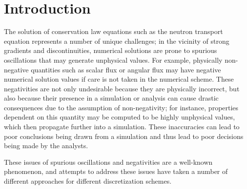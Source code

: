 \section{Introduction}
The solution of conservation law equations such as the neutron transport
equation represents a number of unique challenges; in the vicinity of strong
gradients and discontinuities, numerical solutions are prone to spurious
oscillations that may generate unphysical values. For example, physically
non-negative quantities such as scalar flux or angular flux may have negative
numerical solution values if care is not taken in the numerical scheme.
These negativities are not only undesirable because they are physically
incorrect, but also because their presence in a simulation or analysis
can cause drastic consequences due to the assumption of non-negativity;
for instance, properties dependent on this quantity may be computed
to be highly unphysical values, which then propagate further into
a simulation. These inaccuracies can lead to poor conclusions being drawn
from a simulation and thus lead to poor decisions being made by the analysts.

These issues of spurious oscillations and negativities are a well-known
phenomenon, and attempts to address these issues have taken a number
of different approaches for different discretization schemes.
